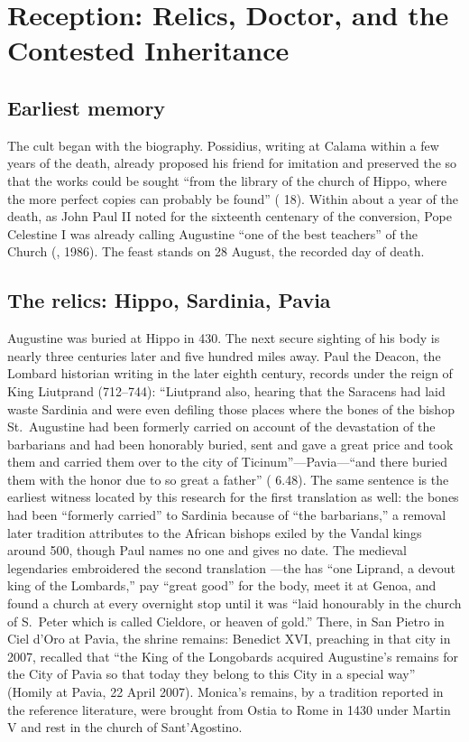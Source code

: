 \section{Reception: Relics, Doctor, and the Contested Inheritance}

\subsection{Earliest memory}

The cult began with the biography. Possidius, writing at Calama within a few
years of the death, already proposed his friend for imitation and preserved
the  so that the works could be sought ``from the library of
the church of Hippo, where the more perfect copies can probably be found''
( 18). Within about a year of the death, as John Paul II noted
for the sixteenth centenary of the conversion, Pope Celestine I was already
calling Augustine ``one of the best teachers'' of the Church
(, 1986). The feast stands on 28 August, the
recorded day of death.

\subsection{The relics: Hippo, Sardinia, Pavia}

Augustine was buried at Hippo in 430. The next secure sighting of his body
is nearly three centuries later and five hundred miles away. Paul the
Deacon, the Lombard historian writing in the later eighth century, records
under the reign of King Liutprand (712--744): ``Liutprand also, hearing that
the Saracens had laid waste Sardinia and were even defiling those places
where the bones of the bishop St.~Augustine had been formerly carried on
account of the devastation of the barbarians and had been honorably buried,
sent and gave a great price and took them and carried them over to the city
of Ticinum''---Pavia---``and there buried them with the honor due to so
great a father'' ( 6.48). The same sentence
is the earliest witness located by this research for the first translation
as well: the bones had been ``formerly carried'' to Sardinia because of
``the barbarians,'' a removal later tradition attributes to the African
bishops exiled by the Vandal kings around 500, though Paul names no one and
gives no date. The medieval legendaries embroidered the second translation
---the  has ``one Liprand, a devout king of the
Lombards,'' pay ``great good'' for the body, meet it at Genoa, and found a
church at every overnight stop until it was ``laid honourably in the church
of S.~Peter which is called Cieldore, or heaven of gold.'' There, in San
Pietro in Ciel d'Oro at Pavia, the shrine remains: Benedict XVI, preaching
in that city in 2007, recalled that ``the King of the Longobards acquired
Augustine's remains for the City of Pavia so that today they belong to this
City in a special way'' (Homily at Pavia, 22 April 2007). Monica's remains,
by a tradition reported in the reference literature, were brought from
Ostia to Rome in 1430 under Martin V and rest in the church of
Sant'Agostino.

